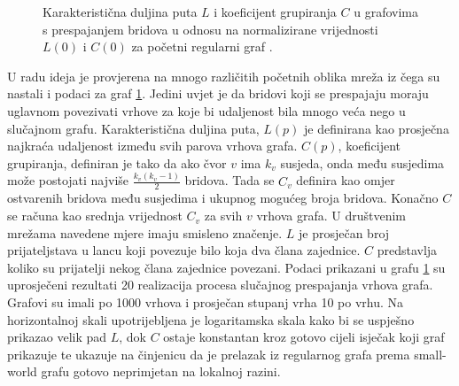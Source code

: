 \begin{figure}
	\caption{Karakteristična duljina puta $L$ i koeficijent grupiranja $C$ u grafovima s prespajanjem bridova u odnosu na normalizirane vrijednosti $L(0)$ i $C(0)$ za početni regularni graf \cite{watts1998collective}.}
	\label{fig:C&L}
\end{figure}

U radu\cite{watts1998collective} ideja je provjerena na mnogo različitih početnih oblika mreža iz čega su nastali i podaci za graf \ref{fig:C&L}. Jedini uvjet je da bridovi koji se prespajaju moraju uglavnom povezivati vrhove za koje bi udaljenost bila mnogo veća nego u slučajnom grafu. Karakteristična duljina puta, $L(p)$ je definirana kao prosječna najkraća udaljenost između svih parova vrhova grafa. $C(p)$, koeficijent grupiranja, definiran je tako da ako čvor $v$ ima $k_{v}$ susjeda, onda među susjedima može postojati najviše $\frac{k_{v}(k_{v} - 1)}{2}$ bridova. Tada se $C_{v}$ definira kao omjer ostvarenih bridova među susjedima i ukupnog mogućeg broja bridova. Konačno $C$ se računa kao srednja vrijednost $C_{v}$ za svih $v$ vrhova grafa. U društvenim mrežama navedene mjere imaju smisleno značenje. $L$ je prosječan broj prijateljstava u lancu koji povezuje bilo koja dva člana zajednice. $C$ predstavlja koliko su prijatelji nekog člana zajednice povezani. Podaci prikazani u grafu \ref{fig:C&L} su uprosječeni rezultati 20 realizacija procesa slučajnog prespajanja vrhova grafa. Grafovi su imali po 1000 vrhova i prosječan stupanj vrha 10 po vrhu. Na horizontalnoj skali upotrijebljena je logaritamska skala kako bi se uspješno prikazao velik pad  $L$, dok $C$ ostaje konstantan kroz gotovo cijeli isječak koji graf prikazuje te ukazuje na činjenicu da je prelazak iz regularnog grafa prema small-world grafu gotovo neprimjetan na lokalnoj razini.



